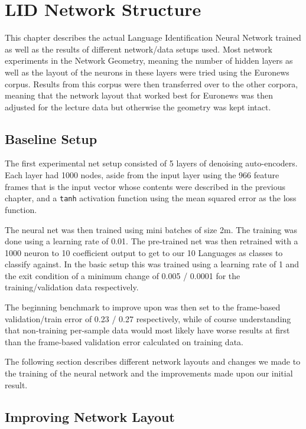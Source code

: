 \chapter{LID Network Structure}
\label{ch:LIDNetwork}

This chapter describes the actual Language Identification Neural Network trained as well as the results of different network/data setups used. Most network experiments in the Network Geometry, meaning the number of hidden layers as well as the layout of the neurons in these layers were tried using the Euronews corpus. Results from this corpus were then transferred over to the other corpora, meaning that the network layout that worked best for Euronews was then adjusted for the lecture data but otherwise the geometry was kept intact.

\section{Baseline Setup}
\label{sec:LIDNetwork:Basic}

The first experimental net setup consisted of 5 layers of denoising auto-encoders. Each layer had 1000 nodes, aside from the input layer using the 966 feature frames that is the input vector whose contents were described in the previous chapter, and a \texttt{tanh} activation function using the mean squared error as the loss function. 

The neural net was then trained using mini batches of size 2m. The training was done using a learning rate of 0.01. The pre-trained net was then retrained with a 1000 neuron to 10 coefficient output to get to our 10 Languages as classes to classify against. In the basic setup this was trained using a learning rate of 1 and the exit condition of a minimum change of 0.005 / 0.0001 for the training/validation data respectively.

The beginning benchmark to improve upon was then set to the frame-based validation/train error of 0.23 / 0.27 respectively, while of course understanding that non-training per-sample data would most likely have worse results at first than the frame-based validation error calculated on training data.

The following section describes different network layouts and changes we made to the training of the neural network and the improvements made upon our initial result.

\section{Improving Network Layout}
\label{sec:LIDNetwork:Layout}

